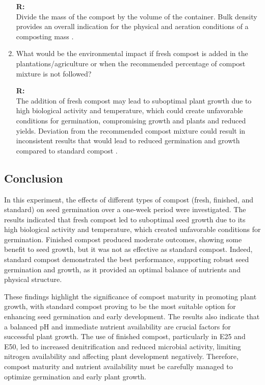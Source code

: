\documentclass{article}
\begin{document}
\begin{enumerate}
        \textbf{R:\\}
        Divide the mass of the compost by the volume of the container. Bulk density
        provides an overall indication for the physical and aeration conditions of a
        composting mass \parencite{bulk_density}.

    \item What would be the environmental impact if fresh compost is added in the
        plantations/agriculture or when the recommended percentage of compost mixture
        is not followed?

        \textbf{R:\\}
        The addition of fresh compost may lead to suboptimal plant growth due to high
        biological activity and temperature, which could create unfavorable conditions for
        germination, compromising growth and plants and reduced yields. Deviation from the
        recommended compost mixture could result in inconsistent results that would lead to
        reduced germination and growth compared to standard compost \parencite{mladenov2018}.

\end{enumerate}

\subsection{Conclusion}
In this experiment, the effects of different types of compost (fresh, finished, and standard)
on seed germination over a one-week period were investigated. The results indicated that
fresh compost led to suboptimal seed growth due to its high biological activity and
temperature, which created unfavorable conditions for germination. Finished compost
produced moderate outcomes, showing some benefit to seed growth, but it was not as
effective as standard compost. Indeed, standard compost demonstrated the best performance,
supporting robust seed germination and growth, as it provided an optimal balance of
nutrients and physical structure.

These findings highlight the significance of compost maturity in promoting plant growth,
with standard compost proving to be the most suitable option for enhancing seed
germination and early development. The results also indicate that a balanced pH and
immediate nutrient availability are crucial factors for successful plant growth. The use
of finished compost, particularly in E25 and E50, led to increased denitrification and
reduced microbial activity, limiting nitrogen availability and affecting plant development
negatively. Therefore, compost maturity and nutrient availability must be carefully
managed to optimize germination and early plant growth.
\end{document}
